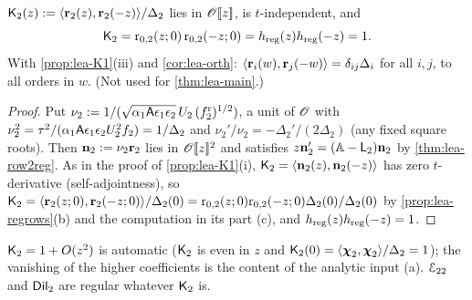 \begin{cor}[$\Ktwo = 1$]
\label{cor:lea-K2}
$\mathsf{K}_{2}(z) := \langle\mathbf{r}_2(z),\mathbf{r}_2(-z)\rangle/\Delta_2$ lies in $\mathscr{O}[\![ z ]\!]$, is $t$-independent, and
\[
\mathsf{K}_{2} = \mathrm{r}_{0,2}(z;0)\,\mathrm{r}_{0,2}(-z;0) = h_{\mathrm{reg}}(z)h_{\mathrm{reg}}(-z) = 1 .
\] With \cref{prop:lea-K1}(iii) and \cref{cor:lea-orth}: $\langle\mathbf{r}_i(w),\mathbf{r}_j(-w)\rangle = \delta_{ij}\Delta_i$ for all $i,j$, to all orders in $w$. (Not used for \cref{thm:lea-main}.)
\end{cor}

\begin{proof}
Put $\nu_2 := 1/(\sqrt{\alpha_1\mathsf{A}\epsilon_1\epsilon_2}\,U_2\,(f_2^{\mathrm{r}})^{1/2})$, a unit of $\mathscr{O}$ with $\nu_2^2 = \tau^2/(\alpha_1\mathsf{A}\epsilon_1\epsilon_2U_2^2f_2) = 1/\Delta_2$ and $\nu_2'/\nu_2 = -\Delta_2'/(2\Delta_2)$ (any fixed square roots). Then $\mathbf{n}_2 := \nu_2\mathbf{r}_2$ lies in $\mathscr{O}[\![ z ]\!]^2$ and satisfies $z\mathbf{n}_2' = (\mathbb{A}-\mathsf{L}_2)\mathbf{n}_2$ by \cref{thm:lea-row2reg}. As in the proof of \cref{prop:lea-K1}(i), $\mathsf{K}_{2} = \langle\mathbf{n}_2(z),\mathbf{n}_2(-z)\rangle$ has zero $t$-derivative (self-adjointness), so $\mathsf{K}_{2} = \langle\mathbf{r}_2(z;0),\mathbf{r}_2(-z;0)\rangle/\Delta_2(0) = \mathrm{r}_{0,2}(z;0)\mathrm{r}_{0,2}(-z;0)\Delta_2(0)/\Delta_2(0)$ by \cref{prop:lea-regrows}(b) and the computation in its part (c), and $h_{\mathrm{reg}}(z)h_{\mathrm{reg}}(-z) = 1$.
\end{proof}

$\mathsf{K}_{2} = 1 + O(z^2)$ is automatic ($\mathsf{K}_{2}$ is even in $z$ and $\mathsf{K}_{2}(0) = \langle\boldsymbol{\chi}_2,\boldsymbol{\chi}_2\rangle/\Delta_2 = 1$); the vanishing of the higher coefficients is the content of the analytic input (a). $\mathcal{E}_{22}$ and $\mathsf{Dil}_2$ are regular whatever $\mathsf{K}_{2}$ is.

